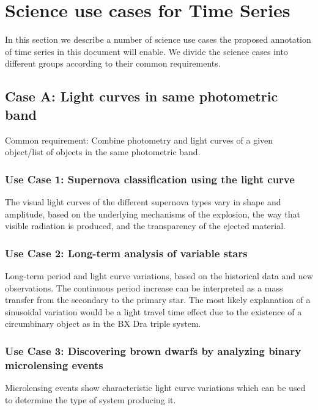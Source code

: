 \documentclass[11pt,a4paper]{ivoa}
\begin{document}
\section{Science use cases for Time Series}
In this section we describe a number of science use cases the proposed annotation of time series in this document will enable. We divide the science cases into different groups according to their common requirements. 
\subsection{Case A: Light curves in same photometric band}
Common requirement: Combine photometry and light curves of a given object/list of objects in the same photometric band. 

\subsubsection{Use Case 1: Supernova classification using the light curve}
The visual light curves of the different supernova types vary in shape and amplitude, based on the underlying mechanisms of the explosion, the way that visible radiation is produced, and the transparency of the ejected material.

\subsubsection{Use Case 2: Long-term analysis of variable stars}
Long-term period and light curve variations, based on the historical data and new observations. The continuous period increase can be interpreted as a mass transfer from the secondary to the primary star. The most likely explanation of a sinusoidal variation would be a light travel time effect due to the existence of a circumbinary object as in the BX Dra triple system.

\subsubsection{Use Case 3: Discovering brown dwarfs by analyzing binary microlensing events}
Microlensing events show characteristic light curve variations which can be used to determine the type of system producing it. %

\end{document}
